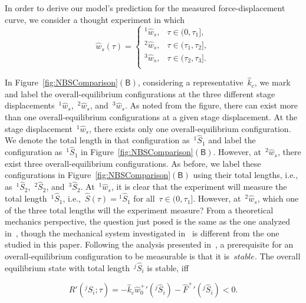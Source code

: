 \documentclass[preprint,10pt,times]{elsarticle}
\numberwithin{equation}{section}
\newcommand{\lsc}[2][\mathscr{l}]{{}^{ #1 }\! #2}
\newcommand{\pr}[1]{\left( #1 \right)}
\newcommand{\subf}[1]{\pr{\textsf{#1}}}
\begin{document}
In order to derive our model's prediction for the measured force-displacement
curve, we consider a thought experiment in which\begin{equation}
\hat{w}_s(\tau)=\left\{
\begin{array}{ll}
\lsc[1]{\hat{w}}_s,&\tau\in(0,\tau_1],\\
\lsc[2]{\hat{w}}_s,&\tau\in(\tau_1,\tau_2],\\
\lsc[3]{\hat{w}}_s,&\tau\in(\tau_2,\tau_3].\\
\end{array}
\right.
\label{eq:DiscontinuousWs}
\end{equation}

In Figure~\ref{fig:NBSComparison}$\subf{B}$, considering a representative~$\hat{k}_c$,
we mark and label the overall-equilibrium configurations at the three
different stage displacements~$\lsc[1]{\hat{w}}_s$,~$\lsc[2]{\hat{w}}_s$,
and~$\lsc[3]{\hat{w}}_s$. As noted from the figure, there can exist
more than one overall-equilibrium configurations at a given stage
displacement. At the stage displacement~$\lsc[1]{\hat{w}}_s$, there
exists only one overall-equilibrium configuration. We denote the total
length in that configuration as~$\lsc[1]{\hat{S}}_1$ and label the
configuration as~$\lsc[1]{\hat{S}}_1$ in Figure~\ref{fig:NBSComparison}$\subf{B}$.
However, at~$\lsc[2]{\hat{w}}_s$, there exist three overall-equilibrium
configurations. As before, we label these configurations in Figure~\ref{fig:NBSComparison}$\subf{B}$
using their total lengths, i.e., as~$\lsc[1]{\hat{S}}_2$,~$\lsc[2]{\hat{S}}_2$,
and~$\lsc[3]{\hat{S}}_2$. At~$\lsc[1]{\hat{w}}_s$, it is clear
that the experiment will measure the total length~$\lsc[1]{\hat{S}}_1$,
i.e.,~$\hat{S}(\tau)=\lsc[1]{\hat{S}}_1$ for all~$\tau\in (0,\tau_1]$.
However, at~$\lsc[2]{\hat{w}}_s$, which one of the three total lengths
will the experiment measure? From a theoretical mechanics perspective,
the question just posed is the same as the one analyzed in~\cite[Section 3 in][]{deng2019effect,kesari2011effective,deng2020angle},
though the mechanical system investigated in~\cite{deng2019effect,kesari2011effective,deng2020angle}
is different from the one studied in this paper. Following the analysis
presented in~\cite{deng2019effect,kesari2011effective,deng2020angle},
a prerequisite for an overall-equilibrium configuration to be measurable
is that it is~$\textit{stable}$. The overall equilibrium state with
total length~$\lsc[j]{\hat{S}}_i$ is stable, iff

\begin{equation}
R'\pr{\lsc[j]{\hat{S}}_i;\tau}=-\hat{k}_c\left.\hat{w}_{0}^{+}\right.'\pr{\lsc[j]{\hat{S}}_i}
-\left.\hat{F}^{+}\right.'\pr{\lsc[j]{\hat{S}}_i}<0.
\label{eq:StabilityCriteria}
\end{equation}
\end{document}
